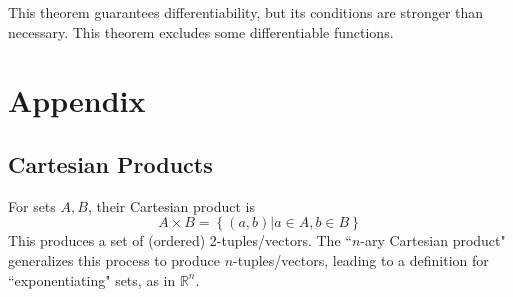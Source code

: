 \documentclass{article}
\begin{document}
This theorem guarantees differentiability, but its conditions are stronger than necessary. This theorem excludes some differentiable functions.

\section{Appendix}
\subsection{Cartesian Products} \label{set-multiplication}
For sets $A, B$, their Cartesian product is $$A \times B = \left\{ (a,b) | a \in A, b \in B\right\}$$
This produces a set of (ordered) 2-tuples/vectors.
The ``$n$-ary Cartesian product" generalizes this process to produce $n$-tuples/vectors, leading to a definition for ``exponentiating" sets, as in $\mathbb{R}^n$.
\end{document}
